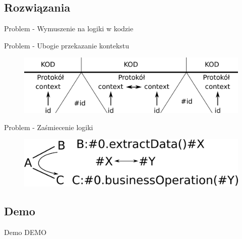 \documentclass[smaller]{beamer}
\begin{document}

\subsection{Rozwiązania}
\begin{frame}{Problem - Wymuszenie na logiki w kodzie}

\LstLogicDropSolution

\end{frame}


\begin{frame}{Problem - Ubogie przekazanie kontekstu}
\begin{figure}
 \centering
 \includegraphics[width=1\textwidth]{contextMapSolutionFig}
\end{figure}
\end{frame}

\begin{frame}{Problem - Zaśmiecenie logiki}
\LstLogicGarbage

\begin{figure}
 \centering
 \includegraphics[width=1\textwidth]{logicGarbageSimpleSolutionFig}
\end{figure}
\end{frame}

\subsection{Demo}
\begin{frame}{Demo}
 DEMO
\end{frame}
\end{document}
